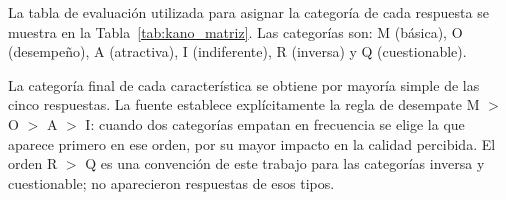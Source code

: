 La tabla de evaluación utilizada para asignar la categoría de cada respuesta se muestra en la Tabla~\ref{tab:kano_matriz}. Las categorías son: M (básica), O (desempeño), A (atractiva), I (indiferente), R (inversa) y Q (cuestionable).

\begin{table}[htbp]
\centering
\footnotesize
\caption{Tabla de evaluación del modelo Kano.}
\label{tab:kano_matriz}
\end{table}

La categoría final de cada característica se obtiene por mayoría simple de las cinco respuestas. La fuente \cite{mkpojiogu2016} establece explícitamente la regla de desempate M $>$ O $>$ A $>$ I: cuando dos categorías empatan en frecuencia se elige la que aparece primero en ese orden, por su mayor impacto en la calidad percibida. El orden R $>$ Q es una convención de este trabajo para las categorías inversa y cuestionable; no aparecieron respuestas de esos tipos.

